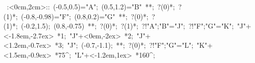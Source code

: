 
%


\hbox{
\xy    <4cm,0cm>:<0cm,2cm>::
       (-0.5,0.5)="A"; (0.5,1.2)="B" **\dir{-}; ?(0)*\dir{<}; ?(1)*\dir{>};
       (-0.8,-0.98)="F"; (0.8,0.2)="G" **\dir{-}; ?(0)*\dir{<}; ?(1)*\dir{>};
       (-0.2,1.5); (0.8,-0.75) **\dir{-}; ?(0)*\dir{<}; ?(1)*\dir{>};
       ?!{"A";"B"}="J";  ?!{"F";"G"}="K";
       "J"+<-1.8em,-2.7ex> *{1};
       "J"+<0em,-2ex> *{2};
       "J"+<1.2em,-0.7ex> *{3};
       "J"; (-0.7,-1.1); **\dir{-}; ?(0)*\dir{<};
       ?!{"F";"G"}="L"; 
       "K"+<1.5em,-0.9ex> *{75^\circ};
       "L"+<-1.2em,1ex> *{160^\circ};
\endxy}


